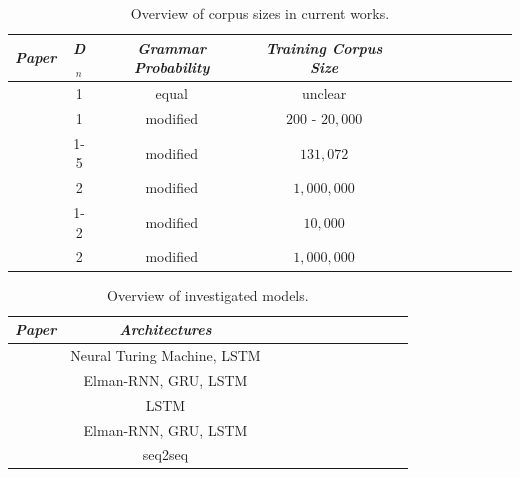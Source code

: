 \begin{table}
	\begin{tabularx}{\textwidth}{@{}l*{10}{C}c@{}}
		\toprule 		
		\textit{Paper} & \textit{D$_n$} & \textit{Grammar Probability} & \textit{Training Corpus Size} \\ 
		\toprule 
		\cite{Deleu2016} & 1 & equal & unclear \\ 
		\cite{Li2018} & 1 & modified & $200$ - $20,000$ \\ 
		\cite{Skachkova2018} & 1-5 & modified & $131,072$ \\ 
		\cite{Sennhauser2018} & 2 & modified & $1,000,000$ \\ 
		\cite{Suzgun2019} & 1-2 & modified & $10,000$ \\ 
		\cite{Yu2019} & 2 & modified & $1,000,000$ \\ 
		\bottomrule
	\end{tabularx}
	\caption[Corpus sizes in current works]{Overview of corpus sizes in current works.}
	\label{tab:LiteratureCorpusOverview}
\end{table}


\begin{table}
	\begin{tabularx}{\textwidth}{@{}l*{10}{C}c@{}}
	\toprule 
	\textit{Paper} & \textit{Architectures}\\
	\toprule 
	\cite{Deleu2016} & Neural Turing Machine, LSTM\\
	\cite{Skachkova2018} & Elman-RNN, GRU, LSTM\\
	\cite{Sennhauser2018} & LSTM\\
	\cite{Suzgun2019} & Elman-RNN, GRU, LSTM\\
	\cite{Yu2019} & seq2seq\\ 
	\bottomrule
	\end{tabularx}
	\caption[Overview of investigated models]{Overview of investigated models.}
	\label{tab:LiteratureInvestigatedModels}
\end{table} 

